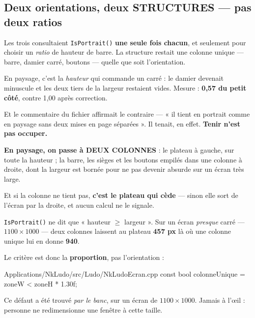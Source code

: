 \subsection{Deux orientations, deux STRUCTURES --- pas deux ratios}

\begin{nkpiege}
Les trois consultaient \texttt{IsPortrait()} \textbf{une seule fois chacun}, et
seulement pour choisir un \emph{ratio} de hauteur de barre. La structure
restait une colonne unique --- barre, damier carré, boutons --- quelle que soit
l'orientation.

En paysage, c'est la \emph{hauteur} qui commande un carré : le damier devenait
minuscule et les deux tiers de la largeur restaient vides. Mesure : \textbf{0,57
du petit côté}, contre 1,00 après correction.

\alerte{} Et le commentaire du fichier affirmait le contraire --- « il tient en portrait
comme en paysage sans deux mises en page séparées ». Il tenait, en effet.
\textbf{Tenir n'est pas occuper.}
\end{nkpiege}

\begin{nkretenir}
\textbf{En paysage, on passe à DEUX COLONNES} : le plateau à gauche, sur toute
la hauteur ; la barre, les sièges et les boutons empilés dans une colonne à
droite, dont la largeur est bornée pour ne pas devenir absurde sur un écran très
large.

Et si la colonne ne tient pas, \textbf{c'est le plateau qui cède} --- sinon elle
sort de l'écran par la droite, et aucun calcul ne le signale.
\end{nkretenir}

\begin{nkpiege}
\texttt{IsPortrait()} ne dit que « hauteur $\geq$ largeur ». Sur un écran
\emph{presque} carré --- $1100 \times 1000$ --- deux colonnes laissent au plateau
\textbf{457 px} là où une colonne unique lui en donne \textbf{940}.

Le critère est donc la \textbf{proportion}, pas l'orientation :

\begin{nkcode}{Applications/NkLudo/src/Ludo/NkLudoEcran.cpp}
const bool colonneUnique = zoneW < zoneH * 1.30f;
\end{nkcode}

Ce défaut a été trouvé \emph{par le banc}, sur un écran de $1100 \times 1000$.
Jamais à l'\oe il : personne ne redimensionne une fenêtre à cette taille.
\end{nkpiege}

